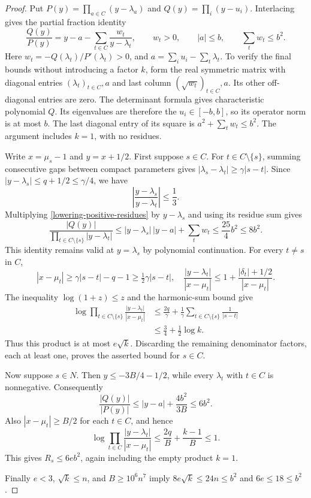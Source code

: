 \begin{proof}
Put $P(y)=\prod_{a\in C}(y-\lambda_a)$ and
$Q(y)=\prod_i(y-u_i)$.  Interlacing gives the partial fraction identity
\begin{equation}\label{lowering-positive-residues}
 \frac{Q(y)}{P(y)}=y-a-\sum_{t\in C}\frac{w_t}{y-\lambda_t},
 \qquad w_t>0,\qquad |a|\le b,\qquad\sum_tw_t\le b^2.
\end{equation}
Here $w_t=-Q(\lambda_t)/P'(\lambda_t)>0$, and
$a=\sum_i u_i-\sum_t\lambda_t$.  To verify the final bounds without
introducing a factor $k$, form the real symmetric matrix with diagonal
entries $(\lambda_t)_{t\in C},a$ and last column
$(\sqrt{w_t})_{t\in C},a$.  Its other off-diagonal entries are zero.
The determinant formula gives characteristic polynomial $Q$.
Its eigenvalues are therefore the $u_i\in[-b,b]$, so its operator norm
is at most $b$.  The last diagonal entry of its square is
$a^2+\sum_tw_t\le b^2$.  The argument includes $k=1$, with no residues.

Write $x=\mu_s-1$ and $y=x+1/2$.  First suppose $s\in C$.
For $t\in C\setminus\{s\}$, summing consecutive gaps between compact parameters gives
$|\lambda_s-\lambda_t|\ge\gamma|s-t|$.  Since
$|y-\lambda_s|\le q+1/2\le\gamma/4$, we have
\[
       \left|\frac{y-\lambda_s}{y-\lambda_t}\right|\le\frac13.
\]
Multiplying \eqref{lowering-positive-residues} by $y-\lambda_s$
and using its residue sum gives
\[
 \frac{|Q(y)|}{\prod_{t\in C\setminus\{s\}}|y-\lambda_t|}
 \le |y-\lambda_s|\,|y-a|+\sum_tw_t
 \le\frac{25}{4}b^2\le8b^2.
\]
This identity remains valid at $y=\lambda_s$ by polynomial
continuation.  For every $t\ne s$ in $C$,
\[
 |x-\mu_t|\ge\gamma|s-t|-q-1
                   \ge\tfrac12\gamma|s-t|,
 \quad
 \frac{|y-\lambda_t|}{|x-\mu_t|}
          \le1+\frac{|\delta_t|+1/2}{|x-\mu_t|}.
\]
The inequality $\log(1+z)\le z$ and the harmonic-sum bound give
\[
 \begin{split}
 \log\prod_{t\in C\setminus\{s\}}
               \frac{|y-\lambda_t|}{|x-\mu_t|}
 &\le\frac{2q}{\gamma}
              +\frac1\gamma\sum_{t\in C\setminus\{s\}}\frac1{|s-t|}\\
 &\le\frac34+\frac12\log k.
 \end{split}
\]
Thus this product is at most $e\sqrt{k}$.  Discarding the remaining
denominator factors, each at least one, proves the asserted bound for $s\in C$.

Now suppose $s\in N$.  Then $y\le-3B/4-1/2$, while every
$\lambda_t$ with $t\in C$ is nonnegative.  Consequently
\[
 \frac{|Q(y)|}{|P(y)|}
 \le |y-a|+\frac{4b^2}{3B}\le6b^2.
\]
Also $|x-\mu_t|\ge B/2$ for each $t\in C$, and hence
\[
 \log\prod_{t\in C}\frac{|y-\lambda_t|}{|x-\mu_t|}
 \le\frac{2q}{B}+\frac{k-1}{B}\le1.
\]
This gives $R_s\le6eb^2$, again including the empty product $k=1$.

Finally $e<3$, $\sqrt k\le n$, and $B\ge10^6n^7$ imply
$8e\sqrt k\le24n\le b^2$ and $6e\le18\le b^2$.
\end{proof}

